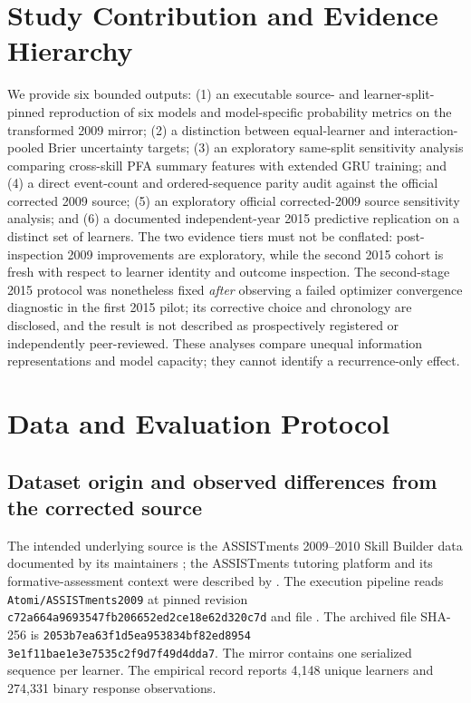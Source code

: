 \documentclass[11pt,a4paper]{article}
\begin{document}
\section{Study Contribution and Evidence Hierarchy}
We provide six bounded outputs: (1) an executable source- and learner-split-pinned reproduction of six models and model-specific probability metrics on the transformed 2009 mirror; (2) a distinction between equal-learner and interaction-pooled Brier uncertainty targets; (3) an exploratory same-split sensitivity analysis comparing cross-skill PFA summary features with extended GRU training; and (4) a direct event-count and ordered-sequence parity audit against the official corrected 2009 source; (5) an exploratory official corrected-2009 source sensitivity analysis; and (6) a documented independent-year 2015 predictive replication on a distinct set of learners. The two evidence tiers must not be conflated: post-inspection 2009 improvements are exploratory, while the second 2015 cohort is fresh with respect to learner identity and outcome inspection. The second-stage 2015 protocol was nonetheless fixed \emph{after} observing a failed optimizer convergence diagnostic in the first 2015 pilot; its corrective choice and chronology are disclosed, and the result is not described as prospectively registered or independently peer-reviewed. These analyses compare unequal information representations and model capacity; they cannot identify a recurrence-only effect.

\section{Data and Evaluation Protocol}
\subsection{Dataset origin and observed differences from the corrected source}
The intended underlying source is the ASSISTments 2009--2010 Skill Builder data documented by its maintainers \citep{assistmentsdata}; the ASSISTments tutoring platform and its formative-assessment context were described by \citet{feng2009}. The execution pipeline reads \texttt{Atomi/ASSISTments2009} at pinned revision \texttt{c72a664a9693547fb206652}\allowbreak\texttt{ed2ce18e62d320c7d} and file . The archived file SHA-256 is \texttt{2053b7ea63f1d5ea953834bf82ed8954}\\\texttt{3e1f11bae1e3e7535c2f9d7f49d4dda7}. The mirror contains one serialized sequence per learner. The empirical record reports 4,148 unique learners and 274,331 binary response observations.
\end{document}
